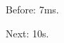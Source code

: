 \documentclass{beamer}
\date{}
\newcommand{\unit}{ms}
\let\change\renewcommand
\begin{document}
\begin{frame}Before: 7\unit.\end{frame}
\change{\unit}{s}
\begin{frame}Next: 10\unit.\end{frame}
\end{document}
